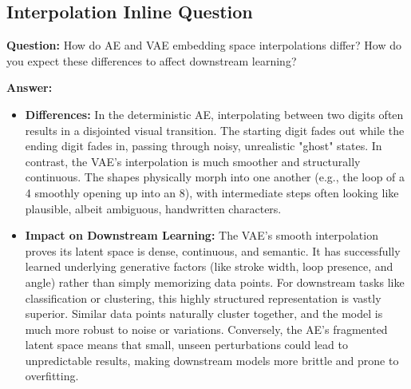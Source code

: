 \documentclass[11pt]{article}
\begin{document}
\subsection{Interpolation Inline Question}
\textbf{Question:} How do AE and VAE embedding space interpolations differ? How do you expect these differences to affect downstream learning?

\textbf{Answer:} 
\begin{itemize}
    \item \textbf{Differences:} In the deterministic AE, interpolating between two digits often results in a disjointed visual transition. The starting digit fades out while the ending digit fades in, passing through noisy, unrealistic "ghost" states. In contrast, the VAE's interpolation is much smoother and structurally continuous. The shapes physically morph into one another (e.g., the loop of a 4 smoothly opening up into an 8), with intermediate steps often looking like plausible, albeit ambiguous, handwritten characters.
    \item \textbf{Impact on Downstream Learning:} The VAE's smooth interpolation proves its latent space is dense, continuous, and semantic. It has successfully learned underlying generative factors (like stroke width, loop presence, and angle) rather than simply memorizing data points. For downstream tasks like classification or clustering, this highly structured representation is vastly superior. Similar data points naturally cluster together, and the model is much more robust to noise or variations. Conversely, the AE's fragmented latent space means that small, unseen perturbations could lead to unpredictable results, making downstream models more brittle and prone to overfitting.
\end{itemize}
\end{document}
